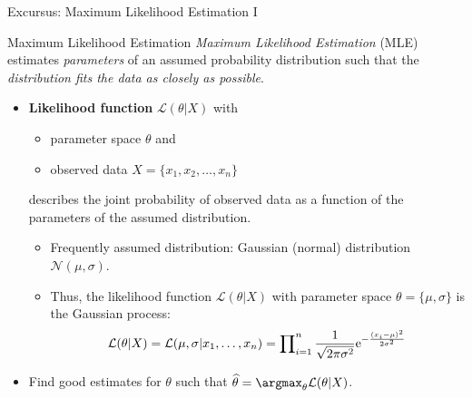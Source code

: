 \begin{frame}{Excursus: Maximum Likelihood Estimation I}
	\begin{block}{Maximum Likelihood Estimation}
		\textit{Maximum Likelihood Estimation} (MLE) estimates \textit{parameters} of an assumed probability distribution such that the \textit{distribution fits the data as closely as possible}.
	\end{block}
	\begin{itemize}
		\item \textbf{Likelihood function} $\mathcal{L}(\theta|X)$ with
		      \begin{itemize}
			      \item parameter space $\theta$ and
			      \item observed data $X=\{x_1, x_2, \dots, x_n\}$
		      \end{itemize}
		      describes the joint probability of observed data as a function of the parameters of the assumed distribution.
		      \begin{itemize}
			      \item Frequently assumed distribution: Gaussian (normal) distribution $\mathcal{N}(\mu, \sigma)$.
			      \item Thus, the likelihood function $\mathcal{L}(\theta|X)$ with parameter space $\theta=\{\mu, \sigma\}$ is the Gaussian process:
			            \begin{equation*}
				            \mathcal{L}(\theta|X)=\mathcal{L}(\mu, \sigma|x_1, \dots, x_n) = \prod\nolimits_{i=1}^n \frac{1}{\sqrt{2\pi \sigma^2}} {\rm e}^{-\frac{(x_i-\mu)^2}{2\sigma^2}}
			            \end{equation*}
		      \end{itemize}
		\item Find good estimates for $\theta$ such that $\widehat{\theta} = \argmax_{\theta} \mathcal{L}(\theta|X)$.
	\end{itemize}
\end{frame}


